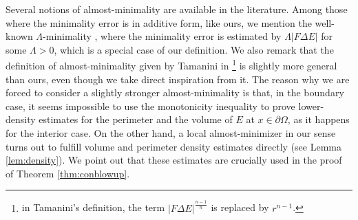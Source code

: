 \documentclass[a4paper,reqno,11pt]{amsart}
\newcommand{\de}{\partial}
\newcommand{\difsim}{\Delta}
\begin{document}
Several notions of almost-minimality are available in the literature. Among those where the minimality error is in additive form, like ours, we mention the well-known $\Lambda$-minimality \cite{Ambrosio_Introduttivo_00,maggi2012sets}, where the minimality error is estimated by $\Lambda |F \difsim E|$ for some $\Lambda>0$, which is a special case of our definition. We also remark that the definition of almost-minimality given by Tamanini in \cite{Tamanini_quadLecce}\footnote{in Tamanini's definition, the term $|F \difsim E|^{\frac{n-1}{n}}$ is replaced by $r^{n-1}$.} is slightly more general than ours, even though we take direct inspiration from it. The reason why we are forced to consider a slightly stronger almost-minimality is that, in the boundary case, it seems impossible to use the monotonicity inequality to prove lower-density estimates for the perimeter and the volume of $E$ at $x\in \de\Omega$, as it happens for the interior case. On the other hand, a local almost-minimizer in our sense turns out to fulfill volume and perimeter density estimates directly (see Lemma \ref{lem:density}). We point out that these estimates are crucially used in the proof of Theorem \ref{thm:conblowup}. 
\end{document}
